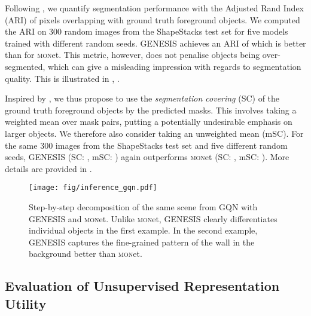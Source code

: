 \documentclass{article}
\begin{document}
Following \citet{greff2019multi}, we quantify segmentation performance with the Adjusted Rand Index (ARI) of pixels overlapping with ground truth foreground objects.
We computed the ARI on 300 random images from the ShapeStacks test set for five models trained with different random seeds.
\mbox{\gls{GENESIS}} achieves an ARI of  which is better than  for \textsc{mon}et.
This metric, however, does not penalise objects being over-segmented, which can give a misleading impression with regards to segmentation quality.
This is illustrated in , .

Inspired by \citet{arbelaez2010contour}, we thus propose to use the \emph{segmentation covering} (SC) of the ground truth foreground objects by the predicted masks.
This involves taking a weighted mean over mask pairs, putting a potentially undesirable emphasis on larger objects.
We therefore also consider taking an unweighted mean (mSC).
For the same 300 images from the ShapeStacks test set and five different random seeds, \gls{GENESIS} (SC: , mSC: ) again outperforms \textsc{mon}et (SC: , mSC: ).
More details are provided in .


\begin{figure}[h]
    \centering
    \texttt{[image: fig/inference\_gqn.pdf]}
    \caption{Step-by-step decomposition of the same scene from GQN with \gls{GENESIS} and \textsc{mon}et. Unlike \textsc{mon}et, \gls{GENESIS} clearly differentiates individual objects in the first example. In the second example, \gls{GENESIS} captures the fine-grained pattern of the wall in the background better than \textsc{mon}et.}
    \label{fig:decomposition_gqn}
\end{figure}








\subsection{Evaluation of Unsupervised Representation Utility}
\label{sec:semi}
\end{document}
